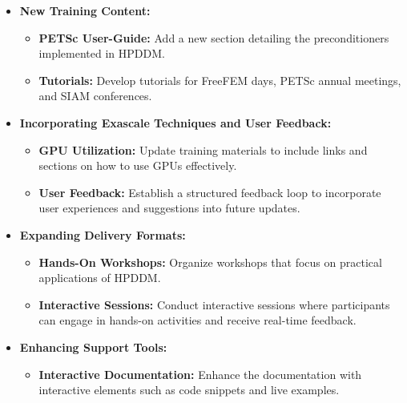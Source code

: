 \begin{itemize}
    \item \textbf{New Training Content:}
    \begin{itemize}
        \item \textbf{PETSc User-Guide:} Add a new section detailing the preconditioners implemented in HPDDM.
        \item \textbf{Tutorials:} Develop tutorials for FreeFEM days, PETSc annual meetings, and SIAM conferences.
    \end{itemize}

    \item \textbf{Incorporating Exascale Techniques and User Feedback:}
    \begin{itemize}
        \item \textbf{GPU Utilization:} Update training materials to include links and sections on how to use GPUs effectively.
        \item \textbf{User Feedback:} Establish a structured feedback loop to incorporate user experiences and suggestions into future updates.
    \end{itemize}

    \item \textbf{Expanding Delivery Formats:}
    \begin{itemize}
        \item \textbf{Hands-On Workshops:} Organize workshops that focus on practical applications of HPDDM.
        \item \textbf{Interactive Sessions:} Conduct interactive sessions where participants can engage in hands-on activities and receive real-time feedback.
    \end{itemize}

    \item \textbf{Enhancing Support Tools:}
    \begin{itemize}
        \item \textbf{Interactive Documentation:} Enhance the documentation with interactive elements such as code snippets and live examples.
    \end{itemize}
\end{itemize}
